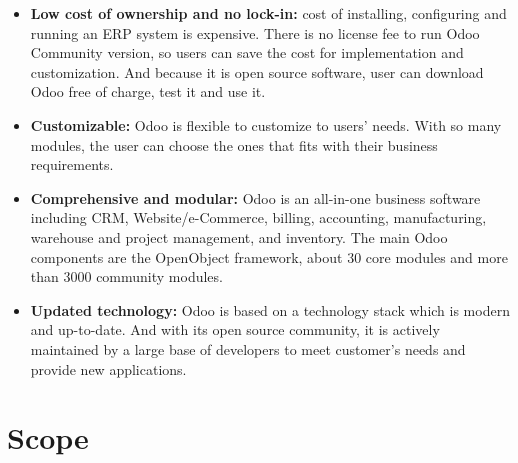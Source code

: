 \begin{itemize}
	\item \textbf{Low cost of ownership and no lock-in:} cost of installing, configuring and running an ERP
system is expensive. There is no license fee to run Odoo Community version, so users can
save the cost for implementation and customization. And because it is open source
software, user can download Odoo free of charge, test it and use it.
	\item \textbf{Customizable:} Odoo is flexible to customize to users’ needs. With so many modules, the
user can choose the ones that fits with their business requirements.
	\item \textbf{Comprehensive and modular:} Odoo is an all-in-one business software including CRM,
Website/e-Commerce, billing, accounting, manufacturing, warehouse and project
management, and inventory. The main Odoo components are the OpenObject framework,
about 30 core modules and more than 3000 community modules.
	\item \textbf{Updated technology:} Odoo is based on a technology stack which is modern and up-to-date.
And with its open source community, it is actively maintained by a large base of developers
to meet customer’s needs and provide new applications.
\end{itemize}

\section{Scope}


